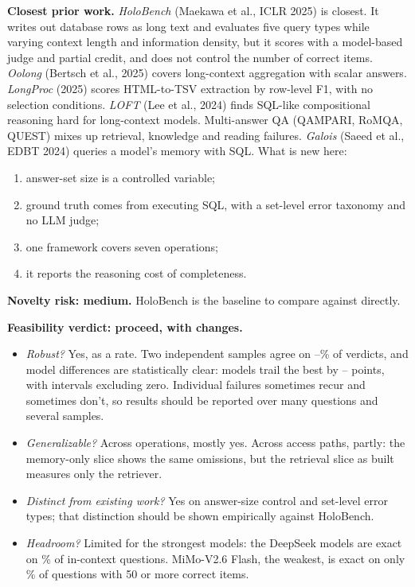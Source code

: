\documentclass[10pt]{article}
\begin{document}
\textbf{Closest prior work.} \emph{HoloBench} (Maekawa et al., ICLR 2025) is closest. It writes out database rows
as long text and evaluates five query types while varying context length and information density, but it scores
with a model-based judge and partial credit, and does not control the number of correct items. \emph{Oolong}
(Bertsch et al., 2025) covers long-context aggregation with scalar answers. \emph{LongProc} (2025) scores
HTML-to-TSV extraction by row-level F1, with no selection conditions. \emph{LOFT} (Lee et al., 2024) finds
SQL-like compositional reasoning hard for long-context models. Multi-answer QA (QAMPARI, RoMQA, QUEST) mixes up
retrieval, knowledge and reading failures. \emph{Galois} (Saeed et al., EDBT 2024) queries a model's memory with
SQL. What is new here:
\begin{enumerate}
\item answer-set size is a controlled variable;
\item ground truth comes from executing SQL, with a set-level error taxonomy and no LLM judge;
\item one framework covers seven operations;
\item it reports the reasoning cost of completeness.
\end{enumerate}
\textbf{Novelty risk: medium.} HoloBench is the baseline to compare against directly.

\textbf{Feasibility verdict: proceed, with changes.}
\begin{itemize}
\item \emph{Robust?} Yes, as a rate. Two independent samples agree on \agreemin--\agreemax\% of verdicts, and model
differences are statistically clear: \nsigbelow{} models trail the best by \deltamin--\deltamax{} points, with intervals excluding zero.
Individual failures sometimes recur and sometimes don't, so results should be reported over many questions and
several samples.
\item \emph{Generalizable?} Across operations, mostly yes. Across access paths, partly: the memory-only slice
shows the same omissions, but the retrieval slice as built measures only the retriever.
\item \emph{Distinct from existing work?} Yes on answer-size control and set-level error types; that distinction
should be shown empirically against HoloBench.
\item \emph{Headroom?} Limited for the strongest models: the DeepSeek models are exact on \exactDSFlash\% of
in-context questions. MiMo-V2.6 Flash, the weakest, is exact on only \largeMiMoFlash\% of questions with 50 or
more correct items.
\end{itemize}
\end{document}
